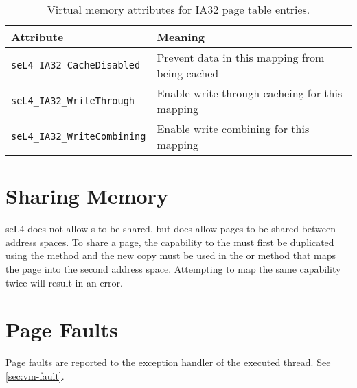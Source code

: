 \begin{table}[htb]
  \begin{center}
    \begin{tabularx}{\textwidth}{p{}X}
      \toprule
      Attribute & Meaning \\
      \midrule
      \texttt{seL4\_IA32\_CacheDisabled} & Prevent data in this mapping
      from being cached \\
      \texttt{seL4\_IA32\_WriteThrough} & Enable write through cacheing for this mapping \\
      \texttt{seL4\_IA32\_WriteCombining} & Enable write combining for this mapping \\
      \bottomrule
    \end{tabularx}
    \caption{\label{tbl:vmattr_ia32} Virtual memory attributes for IA32 page
      table entries.}
  \end{center}
\end{table}

\section{Sharing Memory}

seL4 does not allow s to be shared, but does allow
pages to be shared between address spaces. 
To share a page, the capability to the 
 must first be
duplicated using the  method and the new copy must
be used in the  \ifxeightsix or  \fi method that maps the page into the second
address space. Attempting to map the same capability
twice will result in an error. 


\section{Page Faults}

Page faults are reported to the exception handler of the executed thread.
See \autoref{sec:vm-fault}.
